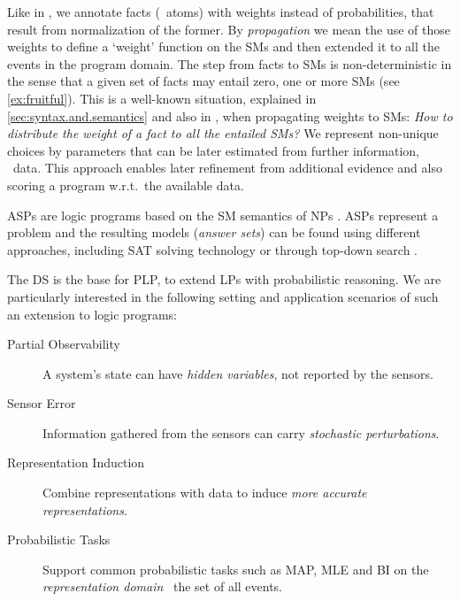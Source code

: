 \documentclass[x11names]{tlp}
\renewcommand{\cite}{\citep}
\begin{document}
%
Like in \lpmln, we annotate facts (\ie\ atoms) with weights \cite{lee2017lpmln} instead of probabilities, that result from normalization of the former.
By \emph{propagation} we mean the use of those weights to define a `weight' function on the \aclp{SM} and then extended it to all the events in the program domain.
%
The step from facts to \acp{SM} is non-deterministic in the sense that a given set of facts may entail zero, one or more \acp{SM} (see \cref{ex:fruitful}).
This is a well-known situation, explained in \cref{sec:syntax.and.semantics} and also in \cite{verreet2022inference,pajunen2021solution,cozman2020joy,baral2009probabilistic}, when propagating weights to \aclp{SM}: \emph{How to distribute the weight of a fact to all the entailed \acp{SM}?}
We represent non-unique choices by parameters that can be later estimated from further information, \ie\ data.
This approach enables later refinement from additional evidence and also scoring a program  w.r.t.\ the available data.
%

\Acfp{ASP} are logic programs based on the \acl{SM} semantics of \acp{NP} \cite{lifschitz2002answer,lifschitz2008twelve}. 
\Acp{ASP} represent a problem and the resulting models (\emph{answer sets}) can be found using different approaches, including SAT solving technology \cite{gebser2011potassco,adrian2018asp,niemela1997smodels} or through top-down search \cite{alberti2017cplint,arias2020justifications,marple2017computing}.

The \ac{DS} \cite{sato1995statistical,riguzzi2022foundations} is the base for \acf{PLP}, to extend \aclp{LP} with probabilistic reasoning.
%
%
%
We are particularly interested in the following setting and application scenarios of such an extension to logic programs:
\begin{description}
	\item[Partial Observability] A system's state can have \emph{hidden variables}, not reported by the sensors. 
	\item[Sensor Error] Information gathered from the sensors can carry \emph{stochastic perturbations}.
	\item[Representation Induction] Combine representations with data to induce \emph{more accurate representations}.
	\item[Probabilistic Tasks] Support common probabilistic tasks such as \acf{MAP}, \ac{MLE} and \ac{BI} on the \emph{representation domain} \ie\ the set of all events.
\end{description}
\end{document}
